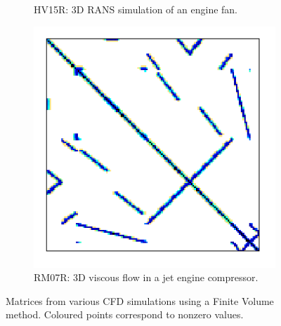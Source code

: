 \begin{figure}
\begin{subfigure}[t]{0.3\textwidth}
  				\caption{HV15R: 3D RANS simulation of an engine fan.}
  				\label{fig:sparse.HV15R}
  			\end{subfigure}
  			\hfill
  			\begin{subfigure}[t]{0.3\textwidth}
  				\centering
  				\includegraphics[width=\textwidth]{figures/RM07R.png}
  				\caption{RM07R: 3D viscous flow in a jet engine compressor.}
  				\label{fig:sparse.RM07R}
  			\end{subfigure}
  			\caption{Matrices from various CFD simulations \cite{PacullAubertBuisson2011} using a Finite Volume method. Coloured points correspond to nonzero values.}
  			\label{fig:sparse}
  		\end{figure}

